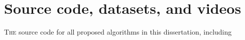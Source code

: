 
{}
\renewcommand{\chaptername}{Appendix} %
\renewcommand\thechapter{\Alph{chapter}}
\setcounter{chapter}{0}
\chapter{Source code, datasets, and videos} %
\label{chapter:appendix}



\ifpdf
    \graphicspath{{X/figures/PNG/}{X/figures/PDF/}{X/figures/}}
\else
    \graphicspath{{X/figures/EPS/}{X/figures/}}
\fi

\begin{sloppypar}
\lettrine{T}{he} source code for all proposed algorithms in this dissertation, including 

\end{sloppypar}



\newpage\thispagestyle{empty}










